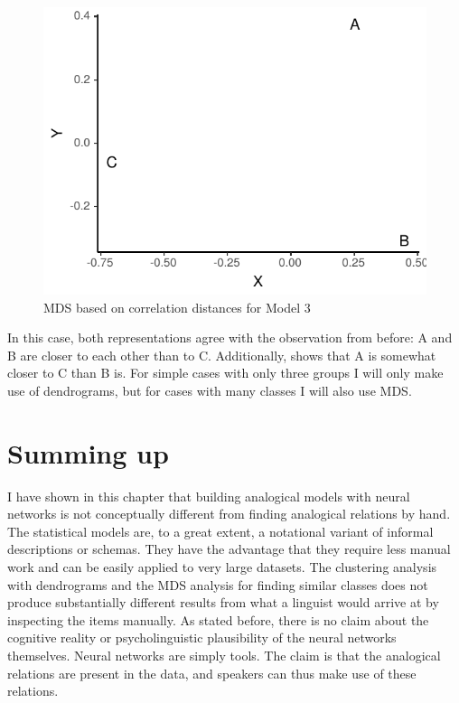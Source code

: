 \begin{figure}%
  \centering
  \includegraphics{./figures/fake/mds3.pdf}
  \caption{MDS based on correlation distances for Model 3}\label{fig:mds-model3}
\end{figure}

In this case, both representations agree with the observation from before: A and B are closer to each other than to C. Additionally,  shows that A is somewhat closer to C than B is. For simple cases with only three groups I will only make use of dendrograms, but for cases with many classes I will also use MDS.

\section{Summing up}

I have shown in this chapter that building analogical models with neural networks is not conceptually different from finding analogical relations by hand. The statistical models are, to a great extent, a notational variant of informal descriptions or schemas. They have the advantage that they require less manual work and can be easily applied to very large datasets. The clustering analysis with dendrograms and the MDS analysis for finding similar classes does not produce substantially different results from what a linguist would arrive at by inspecting the items manually. As stated before, there is no claim about the cognitive reality or psycholinguistic plausibility of the neural networks themselves. Neural networks are simply tools. The claim is that the analogical relations are present in the data, and speakers can thus make use of these relations.

